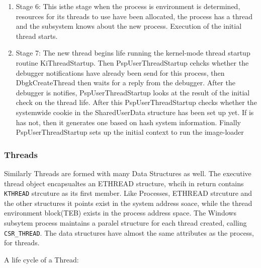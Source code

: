 \documentclass[letterpaper,10pt,draftclsnofoot,onecolumn]{IEEEtran}
\begin{document}
\begin{enumerate}
\item Stage 6: This isthe stage when the process is environment is determined, resources for its threads to use have been allocated, the process has a thread and the subsystem knows about the new process. Execution of the initial thread starts.
\item Stage 7: The new thread begins life running the kernel-mode thread startup routine KiThreadStartup. Then PspUserThreadStartup cehcks whether the debugger notifications have already been send for this process, then DbgkCreateThread then waits for a reply from the debugger. After the debugger is notifies, PspUserThreadStartup looks at the result of the initial check on the thread life. After this PspUserThreadStartup checks whether the systemwide cookie in the SharedUserData structure has been set up yet. If is has not, then it generates one based on hash system information. Finally PspUserThreadStartup sets up the initial context to run the image-loader
\end{enumerate}
\subsubsection*{Threads}

Similarly Threads are formed with many Data Structures as well. The executive thread object encapsualtes an ETHREAD structure, whcih in return contains \verb|KTHREAD| strcuture as its first member. Like Processes, ETHREAD strcuture and the other structures it points exist in the system address soace, while the thread environment block(TEB) exists in the process address space. The Windows subsytem process maintains a paralel structure for each thread created, calling \verb|CSR_THREAD|. The data structures have almost the same attributes as the process, for threads.

A life cycle of a Thread:
\end{document}
